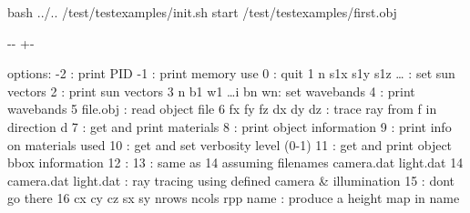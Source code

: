 \documentclass[letterpaper,10pt,english]{sphinxmanual}
\newlength\nbsphinxcodecellspacing
\begin{document}
{
\begin{sphinxVerbatim}[commandchars=\\\{\}]
\llap{\color{nbsphinxin}[28]:\,\hspace{\fboxrule}\hspace{\fboxsep}}\PYGZpc{}\PYGZpc{}bash
 ../..
 /test/test\PYGZus{}examples/init.sh
   start /test/test\PYGZus{}examples/first.obj
\end{sphinxVerbatim}
}

{

\kern-\sphinxverbatimsmallskipamount\kern-\baselineskip
\kern+\FrameHeightAdjust\kern-\fboxrule
\vspace{\nbsphinxcodecellspacing}

\begin{sphinxVerbatim}[commandchars=\\\{\}]
options:
        -2                   : print PID
        -1                   : print memory use
         0                   : quit
         1 n s1x s1y s1z {\ldots} : set sun vectors
         2                   : print sun vectors
         3 n b1 w1 {\ldots}i bn wn: set wavebands
         4                   : print wavebands
         5 file.obj          : read object file
         6 fx fy fz dx dy dz : trace ray from f in direction d
         7                   : get and print materials
         8                   : print object information
         9                   : print info on materials used
         10                  : get and set verbosity level (0-1)
         11                  : get and print object bbox information
         12                    :
         13                  : same as 14 assuming filenames camera.dat light.dat
         14 camera.dat light.dat                : ray tracing using defined camera \& illumination
         15                    : dont go there
         16 cx cy cz sx sy nrows ncols rpp name : produce a height map in name
\end{sphinxVerbatim}
}

{
\begin{sphinxVerbatim}[commandchars=\\\{\}]
\llap{\color{nbsphinxin}[ ]:\,\hspace{\fboxrule}\hspace{\fboxsep}}
\end{sphinxVerbatim}
}
\end{document}
